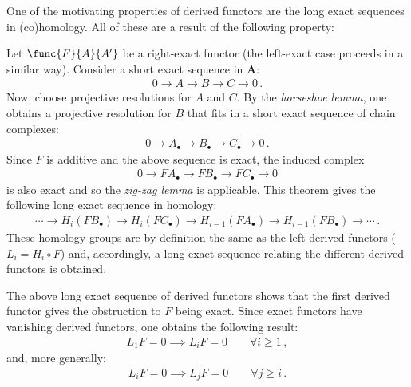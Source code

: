 	One of the motivating properties of derived functors are the long exact sequences in (co)homology. All of these are a result of the following property:
	\begin{property}
		Let $\func{F}{A}{A'}$ be a right-exact functor (the left-exact case proceeds in a similar way). Consider a short exact sequence in $\mathbf{A}$:
		\begin{gather}
			0\longrightarrow A\longrightarrow B\longrightarrow C\longrightarrow 0\,.
		\end{gather}
		Now, choose projective resolutions for $A$ and $C$. By the \textit{horseshoe lemma}, one obtains a projective resolution for $B$ that fits in a short exact sequence of chain complexes:
		\begin{gather}
			0\longrightarrow A_\bullet\longrightarrow B_\bullet\longrightarrow C_\bullet\longrightarrow 0\,.
		\end{gather}
		Since $F$ is additive and the above sequence is exact, the induced complex
		\begin{gather}
			0\longrightarrow FA_\bullet\longrightarrow FB_\bullet\longrightarrow FC_\bullet\longrightarrow0
		\end{gather}
		is also exact and so the \textit{zig-zag lemma} is applicable. This theorem gives the following long exact sequence in homology:
		\begin{gather}
			\cdots\longrightarrow H_i(FB_\bullet)\longrightarrow H_i(FC_\bullet) \longrightarrow H_{i-1}(FA_\bullet) \longrightarrow H_{i-1}(FB_\bullet) \longrightarrow\cdots\,.
		\end{gather}
		These homology groups are by definition the same as the left derived functors ($L_i = H_i\circ F$) and, accordingly, a long exact sequence relating the different derived functors is obtained.
	\end{property}
	\begin{result}
		The above long exact sequence of derived functors shows that the first derived functor gives the obstruction to $F$ being exact. Since exact functors have vanishing derived functors, one obtains the following result:
		\begin{gather}
			L_1F = 0\implies L_iF=0\qquad\forall i\geq 1\,,
		\end{gather}
        and, more generally:
        \begin{gather}
            L_iF = 0\implies L_jF=0\qquad\forall j\geq i\,.
        \end{gather}
	\end{result}

